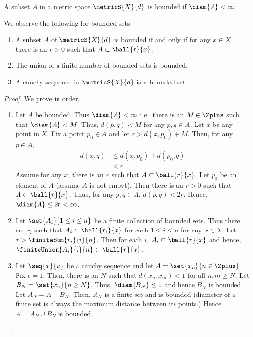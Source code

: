 \begin{Definition}[name= Bounded set]
    A subset $A$ in a metric space $\metricS{X}{d}$ is bounded if $\diam{A} < \infty$.
\end{Definition}
\begin{Proposition}
    We observe the following for bounded sets.
    \begin{enumerate}
	\item
	    A subset $A$ of $\metricS{X}{d}$ is bounded if and only if for any $x \in X$, there is an $r > 0$
	    such that $A \subset \ball{r}{x}$.
	\item
	    The union of a finite number of bounded sets is bounded.
	\item
	    A cauchy sequence in $\metricS{X}{d}$ is a bounded set.
    \end{enumerate}
\end{Proposition}
\begin{proof}
    We prove in order.
    \begin{enumerate}
	\item
	    Let $A$ be bounded. Thus $\diam{A} < \infty$ i.e.~there is an $M \in \Zplus$ such that 
	    $\diam{A} < M$. Thus, $d(p,q) < M$ for any $p,q \in A$. Let $x$ be any point in $X$. Fix a point
	    $p_0 \in A$ and let $r > d(x,p_0) + M$. Then, for any $p \in A$,
	    \begin{align*}
		d(x,q) &\leq d(x,p_0) + d(p_0,q)\\
		& < r.
	    \end{align*}
	    Assume for any $x$, there is an $r$ such that $A \subset \ball{r}{x}$. Let $p_0$ be an element of
	    $A$ (assume $A$ is not empyt). Then there is an $r > 0$ such that $A \subset \ball{r}{x}$. Thus,
	    for any $p,q \in A$, $d(p,q) < 2r$. Hence, $\diam{A} \leq 2r < \infty$.
	\item
	    Let $\set{A_i}{1\leq i \leq n}$ be a finite collection of bounded sets. Thus there are $r_i$
	    such that $A_i \subset \ball{r_i}{x}$ for each $1 \leq i \leq n$ for any $x \in X$. Let $r >
	    \finiteSum{r_i}{i}{n}$. Then for each $i$, $A_i \subset \ball{r}{x}$ and hence,
	    $\finiteUnion{A_i}{i}{n} \subset \ball{r}{x}$.
	\item
	    Let $ \seq{x}{n}$ be a cauchy sequence and let $A = \set{x_n}{n\in\Zplus}$. Fix $\epsilon = 1$.
	    Then, there is an $N$ such that $d(x_n,x_m) < 1$ for all $n,m \geq N$. Let 
	    $B_N = \set{x_n}{n\geq N}$. Thus, $\diam{B_N} \leq 1$ and hence $B_N$ is bounded. 
	    Let $A_N = A - B_N$. Then, $A_N$ is a finite set and is bounded (diameter of a finite set is
	    always the maximum distance between its points.) Hence $A = A_N \cup B_N$ is bounded.
    \end{enumerate}
\end{proof}
